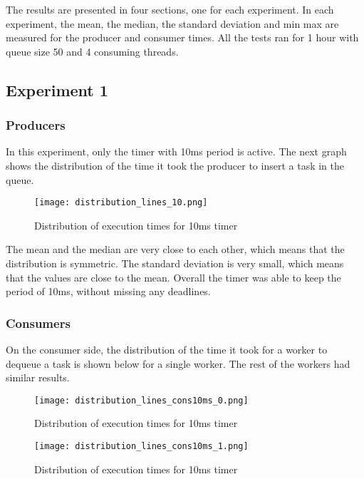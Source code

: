 \documentclass[12pt, a4paper]{report}
\begin{document}
The results are presented in four sections, one for each experiment. In each experiment, the mean, the median,
the standard deviation and min max are measured for the producer and consumer times. All the tests ran for 1
hour with queue size 50 and 4 consuming threads.

\subsection*{Experiment 1}

\subsubsection*{Producers}

In this experiment, only the timer with 10ms period is active. The next graph shows the
distribution of the time it took the producer to insert a task in the queue. 

\begin{figure}[H]
    \centering
    \texttt{[image: distribution\_lines\_10.png]}
    \caption{Distribution of execution times for 10ms timer}
\end{figure}

The mean and the median are very close to each other, which means that the distribution is
symmetric. The standard deviation is very small, which means that the values are close to 
the mean. Overall the timer was able to keep the period of 10ms, without missing any deadlines.

\subsubsection*{Consumers}

On the consumer side, the distribution of the time it took for a worker to dequeue a task is shown
below for a single worker. The rest of the workers had similar results.

\begin{figure}[H]
    \centering
    \texttt{[image: distribution\_lines\_cons10ms\_0.png]}
    \caption{Distribution of execution times for 10ms timer}
\end{figure}

\begin{figure}[H]
    \centering
    \texttt{[image: distribution\_lines\_cons10ms\_1.png]}
    \caption{Distribution of execution times for 10ms timer}
\end{figure}
\end{document}
